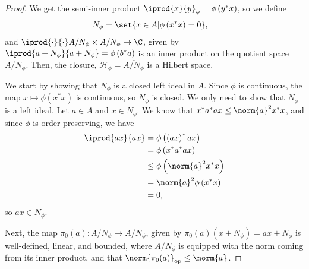 \documentclass[10pt]{mypackage}
\DeclareMathOperator{\op}{op}
\begin{document}
\begin{proof}
  We get the semi-inner product $ \iprod{x}{y}_{\phi} = \phi\left(y^{\ast}x\right) $, so we define
  \begin{align*}
    N_{\phi} &= \set{x\in A | \phi\left(x^{\ast}x\right)=  0},
  \end{align*}
  and $ \iprod{\cdot}{\cdot}A/N_{\phi}\times A/N_{\phi} \rightarrow \C$, given by $ \iprod{a + N_{\phi}}{a + N_{\phi}} = \phi\left(b^{\ast}a\right) $ is an inner product on the quotient space $A/N_{\phi}$. Then, the closure, $\mathcal{H}_{\phi} = \overline{A/N_{\phi}}$ is a Hilbert space.\newline

  We start by showing that $N_{\phi}$ is a closed left ideal in $A$. Since $\phi$ is continuous, the map $x\mapsto \phi\left(x^{\ast}x\right)$ is continuous, so $N_{\phi}$ is closed. We only need to show that $N_{\phi}$ is a left ideal. Let $a\in A$ and $x\in N_{\phi}$. We know that $x^{\ast}a^{\ast}ax \leq \norm{a}^2x^{\ast}x$, and since $\phi$ is order-preserving, we have
  \begin{align*}
    \iprod{ax}{ax} &= \phi\left(\left(ax\right)^{\ast}ax\right)\\
                   &= \phi\left(x^{\ast}a^{\ast}ax\right)\\
                   &\leq \phi\left(\norm{a}^2x^{\ast}x\right)\\
                   &= \norm{a}^2\phi\left(x^{\ast}x\right)\\
                   &= 0,
  \end{align*}
  so $ax\in N_{\phi}$.\newline

  Next, the map $\pi_0\left(a\right)\colon A/N_{\phi}\rightarrow A/N_{\phi}$, given by $\pi_0(a)\left(x + N_{\phi}\right) = ax + N_{\phi}$ is well-defined, linear, and bounded, where $A/N_{\phi}$ is equipped with the norm coming from its inner product, and that $\norm{\pi_0(a)}_{\op} \leq \norm{a}$.\newline


\end{proof}
\end{document}
